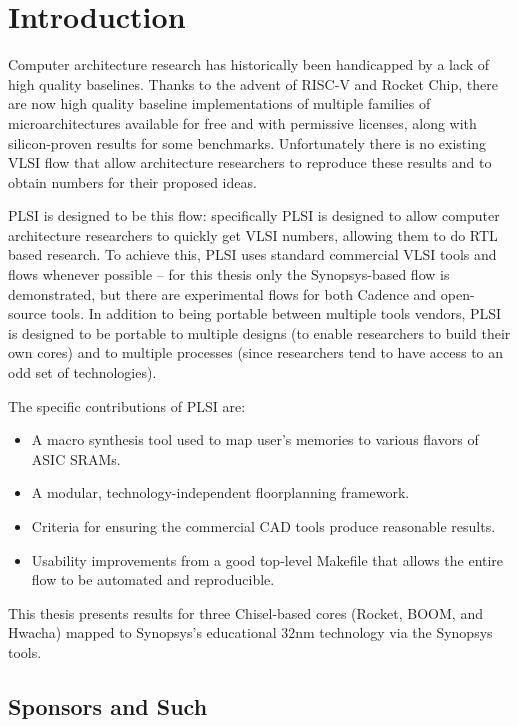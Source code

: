 \documentclass{article}
\begin{document}
\chapter{Introduction}

Computer architecture research has historically been handicapped by a lack of
high quality baselines.  Thanks to the advent of RISC-V and Rocket Chip, there
are now high quality baseline implementations of multiple families of
microarchitectures available for free and with permissive licenses, along with
silicon-proven results for some benchmarks.  Unfortunately there is no existing
VLSI flow that allow architecture researchers to reproduce these results and to
obtain numbers for their proposed ideas.

PLSI is designed to be this flow: specifically PLSI is designed to allow
computer architecture researchers to quickly get VLSI numbers, allowing them to
do RTL based research.  To achieve this, PLSI uses standard commercial VLSI
tools and flows whenever possible -- for this thesis only the Synopsys-based
flow is demonstrated, but there are experimental flows for both Cadence and
open-source tools.  In addition to being portable between multiple tools
vendors, PLSI is designed to be portable to multiple designs (to enable
researchers to build their own cores) and to multiple processes (since
researchers tend to have access to an odd set of technologies).

The specific contributions of PLSI are:

\begin{itemize}
\item A macro synthesis tool used to map user's memories to various flavors of
ASIC SRAMs.
\item A modular, technology-independent floorplanning framework.
\item Criteria for ensuring the commercial CAD tools produce reasonable results.
\item Usability improvements from a good top-level Makefile that allows the
entire flow to be automated and reproducible.
\end{itemize}

This thesis presents results for three Chisel-based cores (Rocket, BOOM, and
Hwacha) mapped to Synopsys's educational 32nm technology via the Synopsys
tools.

\section{Sponsors and Such}

\end{document}
